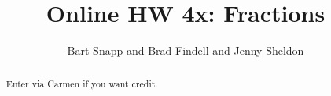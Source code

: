 \documentclass[handout,space,nooutcomes]{xourse}
\title{Online HW 4x: Fractions}
\author{Bart Snapp and Brad Findell and Jenny Sheldon}
\begin{document}
\begin{abstract}
Enter via Carmen if you want credit.   
\end{abstract}
\maketitle


\end{document}
